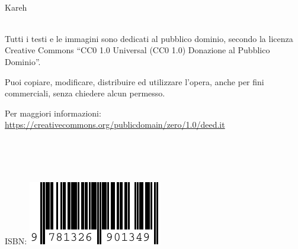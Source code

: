 

\leavevmode\\
\small{\textcopyright} Kareh \\
\leavevmode\\

\vfill

Tutti i testi e le immagini sono dedicati al pubblico dominio, secondo la licenza Creative Commons ``CC0 1.0 Universal (CC0 1.0) Donazione al Pubblico Dominio''.

Puoi copiare, modificare, distribuire ed utilizzare l'opera, anche per fini commerciali, senza chiedere alcun permesso.

Per maggiori informazioni: \url{https://creativecommons.org/publicdomain/zero/1.0/deed.it}

\leavevmode\\
\leavevmode\\
\leavevmode\\

\begin{flushright}
    ISBN: \includegraphics{lulu/isbn/978-1-326-90134-9.pdf}
\end{flushright}

